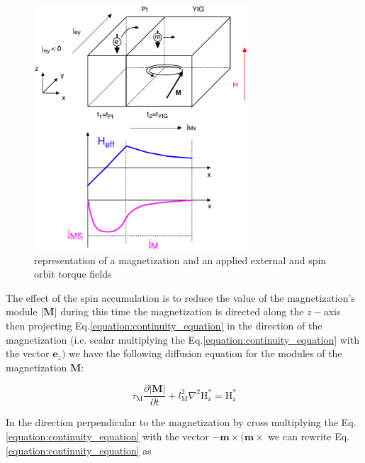 \documentclass[twocolumn, final]{elsarticle}
\begin{document}

\begin{figure}[htbp]
\begin{center}
\includegraphics[width=8cm]{scheme.pdf}
\caption{representation of a magnetization and an applied external and spin orbit torque fields}
\label{scheme}
\end{center}
\end{figure}


The effect of the spin accumulation is to reduce the value of the magnetization's module $|\mathbf{M}|$ during this time the 
magnetization is directed along the $z-$axis then projecting Eq.\ref{equation:continuity_equation} in the direction of the magnetization  
(i.e.  scalar multiplying  the Eq.\ref{equation:continuity_equation} with the vector $\mathbf{e}_z)$ we have the following diffusion 
equation  for the modules of the magnetization $\mathbf{M}$: 


\begin{equation}
\tau_\mathrm{\scriptstyle{M}}\frac{\partial \mathbf{|M|}}{\partial t} + l_\mathrm{\scriptstyle{M}}^2 \nabla^2 \mathrm{H}_{\mathrm{\scriptstyle{z}}}^*  
= \mathrm{H}_{\mathrm{\scriptstyle{z}}}^* 
\end{equation}

In the direction perpendicular to the magnetization by cross multiplying the Eq.\ref{equation:continuity_equation} with the vector $-\mathbf{m}\times(\mathbf{m}\times$ we can 
rewrite Eq.\ref{equation:continuity_equation} as
\end{document}

